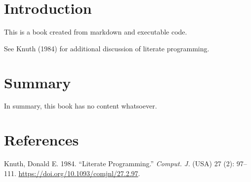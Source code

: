 \documentclass[
  letterpaper,
  DIV=11,
  numbers=noendperiod]{scrreprt}
\newlength{\cslhangindent}
\newenvironment{CSLReferences}[2] %
 {\begin{list}{}{%
  \setlength{\itemindent}{0pt}
  \setlength{\leftmargin}{0pt}
  \setlength{\parsep}{0pt}
  \ifodd #1
   \setlength{\leftmargin}{\cslhangindent}
   \setlength{\itemindent}{-1\cslhangindent}
  \fi
  \setlength{\itemsep}{#2\baselineskip}}}
 {\end{list}}
\begin{document}

\chapter{Introduction}\label{introduction}

This is a book created from markdown and executable code.

See Knuth (1984) for additional discussion of literate programming.


\chapter{Summary}\label{summary}

In summary, this book has no content whatsoever.


\chapter*{References}\label{references}


\protect{}\label{refs}
\begin{CSLReferences}{1}{1}
Knuth, Donald E. 1984. {``Literate Programming.''} \emph{Comput. J.}
(USA) 27 (2): 97--111. \url{https://doi.org/10.1093/comjnl/27.2.97}.

\end{CSLReferences}
\end{document}
